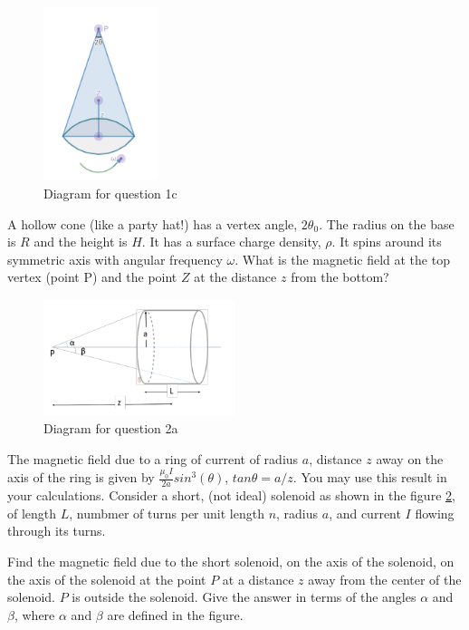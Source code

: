 \documentclass[
  course = {{Electricity and Magnetism 3}},
  term = {{4a Fall 2020}},
  assignment = 1,
  name = {{Andrew Kovachik}},
  studentnumber = {{20673849}},
  email = {{kovachik.andrew@gmail.com ; ajkovach@uwaterloo.ca}},
  firstexercise = 1
]{aga-homework}
\begin{document}
\newpage
\subexercise

\begin{figure}[h]
    \centering
    \includegraphics[width=0.3\textwidth]{cone}
    \caption{Diagram for question 1c}
    \label{cone}
\end{figure}

A hollow cone (like a party hat!) has a vertex angle, $2\theta_0$. The radius on the base is $R$ and
the height is $H$. It has a surface charge density, $\rho$. It spins around its symmetric axis with
angular frequency $\omega$. What is the magnetic field at the top vertex (point P) and the point $Z$
at the distance $z$ from the bottom?


\newpage
\exercise

\subexercise

\begin{figure}[h]
    \centering
    \includegraphics[width=0.5\textwidth]{solenoid}
    \caption{Diagram for question 2a}
    \label{solenoid}
\end{figure}
The magnetic field due to a ring of current of radius $a$, distance $z$ away on the axis of the ring
is given by $\frac{\mu_0I}{2a} sin^3(\theta)$, $tan\theta = a/z$.  You may use this result in your
calculations. Consider a short, (not ideal) solenoid as shown in the figure \ref{solenoid}, of length $L$, numbmer
of turns per unit length $n$, radius $a$, and current $I$ flowing through its turns.

\ssubexercise

Find the magnetic field due to the short solenoid, on the axis of the solenoid, on the axis of the
solenoid at the point $P$ at a distance $z$ away from the center of the solenoid. $P$ is outside the
solenoid. Give the answer in terms of the angles $\alpha$ and $\beta$, where $\alpha$ and $\beta$
are defined in the figure.
\end{document}
